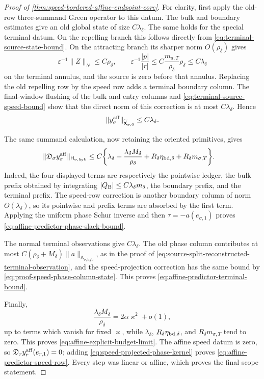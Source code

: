 \begin{proof}[Proof of
\cref{thm:speed-bordered-affine-endpoint-core}]
For clarity, first apply the old-row three-summand Green operator to this
datum.  The bulk and boundary estimates give an old global state of size
\(C\lambda_\delta\).  The same holds for the special terminal datum.  On
the repelling branch this follows directly from
\cref{eq:terminal-source-state-bound}.  On the attracting branch its
sharper norm \(O(\rho_\delta)\) gives
\[
 \varepsilon^{-1}\|Z\|_N\le C\rho_\delta,\qquad
 \varepsilon^{-1}\frac{|p|}{|r|}
 \le C\frac{m_{a,T}}{\rho_\delta}\rho_\delta
 \le C\lambda_\delta
\]
on the terminal annulus, and the source is zero before that annulus.
Replacing the old repelling row by the speed row adds a terminal boundary
column.  The final-window flushing of the bulk and entry columns and
\cref{eq:terminal-source-speed-bound} show that the direct norm of this
correction is at most \(C\lambda_\delta\).  Hence
\begin{equation}
 \|y_\sigma^{\rm aff}\|_{\widetilde{\mathsf X}_{\sigma,0}}
 \le C\lambda_\delta.                           \label{eq:proof-affine-normal-state}
\end{equation}

The same summand calculation, now retaining the oriented primitives,
gives
\begin{align}
 \|\mathfrak D_\sigma y_\sigma^{\rm aff}\|_
       {\mathsf H_{\sigma,\mathrm{hyb}}}
 \le C\biggl\{&
   \lambda_\delta
   +\frac{\lambda_\delta M_\delta}{\rho_\delta}
   +R_\delta\eta_{{\rm bd},\delta}
   +R_\delta m_{\sigma,T}\biggr\}.              \label{eq:proof-affine-returned-action}
\end{align}
Indeed, the four displayed terms are respectively the pointwise ledger,
the bulk prefix obtained by integrating
\(|Q_{\rm B}|\le C\lambda_\delta m_\delta\), the boundary prefix, and the
terminal prefix.  The speed-row correction is another boundary column of
norm \(O(\lambda_\delta)\), so its pointwise and prefix terms are absorbed
by the first term.  Applying the uniform phase Schur inverse and then
\(\tau=-a(e_{\sigma,1})\) proves
\cref{eq:affine-predictor-phase-slack-bound}.

The normal terminal observations give \(C\lambda_\delta\).  The old phase
column contributes at most
\(C(\rho_\delta+M_\delta)\|a\|_{\mathsf A_{\sigma,\mathrm{hyb}}}\),
as in the proof of
\cref{eq:source-split-reconstructed-terminal-observation}, and the
speed-projection correction has the same bound by
\cref{eq:proof-speed-phase-column-state}.  This proves
\cref{eq:affine-predictor-terminal-bound}.

Finally,
\[
 \frac{\lambda_\delta M_\delta}{\rho_\delta}
 =2\alpha\varkappa^2+o(1),
\]
up to terms which vanish for fixed \(\varkappa\), while
\(\lambda_\delta\), \(R_\delta\eta_{{\rm bd},\delta}\), and
\(R_\delta m_{\sigma,T}\) tend to zero.  This proves
\cref{eq:affine-explicit-budget-limit}.  The affine speed datum is
zero, so
\(\mathfrak D_ry_r^{\rm aff}(e_{r,1})=0\); adding
\cref{eq:speed-projected-phase-kernel} proves
\cref{eq:affine-predictor-speed-row}.  Every step was linear or affine,
which proves the final scope statement.
\end{proof}

